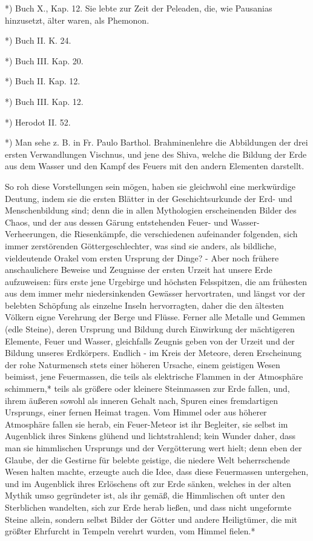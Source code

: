 \documentclass[a4paper, 11pt, oneside, polutonikogreek, german]{article}
\begin{document}
*) Buch X., Kap. 12. Sie lebte zur Zeit der Peleaden, die, wie Pausanias hinzusetzt, älter waren, als Phemonon.

*) Buch II. K. 24.

*) Buch III. Kap. 20.

*) Buch II. Kap. 12.

*) Buch III. Kap. 12.

*) Herodot II. 52.

*) Man sehe z. B. in Fr. Paulo Barthol. Brahminenlehre die Abbildungen der drei ersten Verwandlungen Vischnus, und jene des Shiva, welche die Bildung der Erde aus dem Wasser und den Kampf des Feuers mit den andern Elementen darstellt.

So roh diese Vorstellungen sein mögen, haben sie gleichwohl eine merkwürdige Deutung, indem sie die ersten Blätter in der Geschichtsurkunde der Erd- und Menschenbildung sind; denn die in allen Mythologien erscheinenden Bilder des Chaos, und der aus dessen Gärung entstehenden Feuer- und Wasser-Verheerungen, die Riesenkämpfe, die verschiedenen aufeinander folgenden, sich immer zerstörenden Göttergeschlechter, was sind sie anders, als bildliche, vieldeutende Orakel vom ersten Ursprung der Dinge? - Aber noch frühere anschaulichere Beweise und Zeugnisse der ersten Urzeit hat unsere Erde aufzuweisen: fürs erste jene Urgebirge und höchsten Felsspitzen, die am frühesten aus dem immer mehr niedersinkenden Gewässer hervortraten, und längst vor der belebten Schöpfung als einzelne Inseln hervorragten, daher die den ältesten Völkern eigne Verehrung der Berge und Flüsse. Ferner alle Metalle und Gemmen (edle Steine), deren Ursprung und Bildung durch Einwirkung der mächtigeren Elemente, Feuer und Wasser, gleichfalls Zeugnis geben von der Urzeit und der Bildung unseres Erdkörpers. Endlich - im Kreis der Meteore, deren Erscheinung der rohe Naturmensch stets einer höheren Ursache, einem geistigen Wesen beimisst, jene Feuermassen, die teils als elektrische Flammen in der Atmosphäre schimmern,* teils als größere oder kleinere Steinmassen zur Erde fallen, und, ihrem äußeren sowohl als inneren Gehalt nach, Spuren eines fremdartigen Ursprungs, einer fernen Heimat tragen. Vom Himmel oder aus höherer Atmosphäre fallen sie herab, ein Feuer-Meteor ist ihr Begleiter, sie selbst im Augenblick ihres Sinkens glühend und lichtstrahlend; kein Wunder daher, dass man sie himmlischen Ursprungs und der Vergötterung wert hielt; denn eben der Glaube, der die Gestirne für belebte geistige, die niedere Welt beherrschende Wesen halten machte, erzeugte auch die Idee, dass diese Feuermassen untergehen, und im Augenblick ihres Erlöschens oft zur Erde sänken, welches in der alten Mythik umso gegründeter ist, als ihr gemäß, die Himmlischen oft unter den Sterblichen wandelten, sich zur Erde herab ließen, und dass nicht ungeformte Steine allein, sondern selbst Bilder der Götter und andere Heiligtümer, die mit größter Ehrfurcht in Tempeln verehrt wurden, vom Himmel fielen.*
\end{document}
